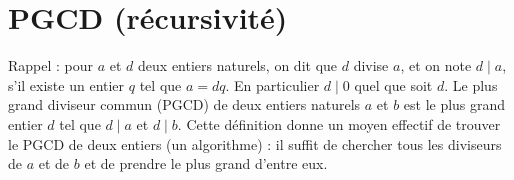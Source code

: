 
\newcommand{\commentaire}[1]{}




\section{PGCD (récursivité)}
Rappel : pour $a$ et $d$ deux entiers naturels, on dit que $d$ divise $a$, et on note $d\mid a$, s'il existe un entier $q$ tel que $a = dq$. En particulier $d\mid 0$ quel que soit $d$. Le plus grand diviseur commun (PGCD) de deux entiers naturels $a$ et $b$ est le plus grand entier $d$ tel que $d\mid a$ et $d\mid b$.  Cette définition donne un moyen effectif de trouver le PGCD de deux entiers (un algorithme) : il suffit de chercher tous les diviseurs de $a$ et de $b$ et de prendre le plus grand d'entre eux.

